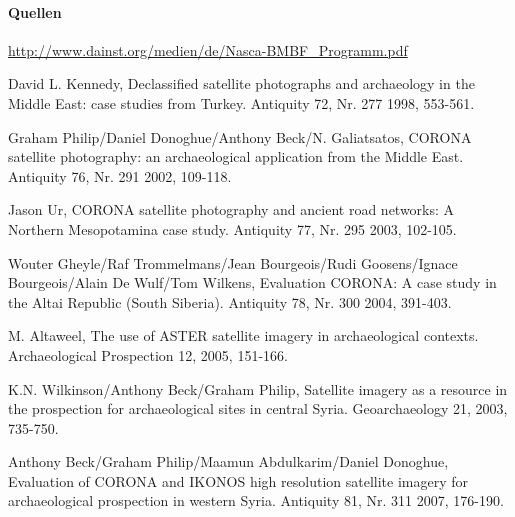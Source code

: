 \paragraph{Quellen}
\begin{flushleft}
\url{http://www.dainst.org/medien/de/Nasca-BMBF_Programm.pdf}

David L. Kennedy, Declassified satellite photographs and archaeology in the Middle East: case studies from Turkey. Antiquity 72, Nr. 277 1998, 553-561.

Graham Philip/Daniel Donoghue/Anthony Beck/N. Galiatsatos, CORONA satellite photography: an archaeological application from the Middle East. Antiquity 76, Nr. 291 2002, 109-118.

Jason Ur, CORONA satellite photography and ancient road networks: A Northern Mesopotamina case study. Antiquity 77, Nr. 295 2003, 102-105.

Wouter Gheyle/Raf Trommelmans/Jean Bourgeois/Rudi Goosens/Ignace Bourgeois/Alain De Wulf/Tom Wilkens, Evaluation CORONA: A case study in the Altai Republic (South Siberia). Antiquity 78, Nr. 300 2004, 391-403.

M. Altaweel, The use of ASTER satellite imagery in archaeological contexts. Archaeological Prospection 12, 2005, 151-166.

K.N. Wilkinson/Anthony Beck/Graham Philip, Satellite imagery as a resource in the prospection for archaeological sites in central Syria. Geoarchaeology 21, 2003, 735-750.

Anthony Beck/Graham Philip/Maamun Abdulkarim/Daniel Donoghue, Evaluation of CORONA and IKONOS high resolution satellite imagery for archaeological prospection in western Syria. Antiquity 81, Nr. 311 2007, 176-190.
\end{flushleft}


